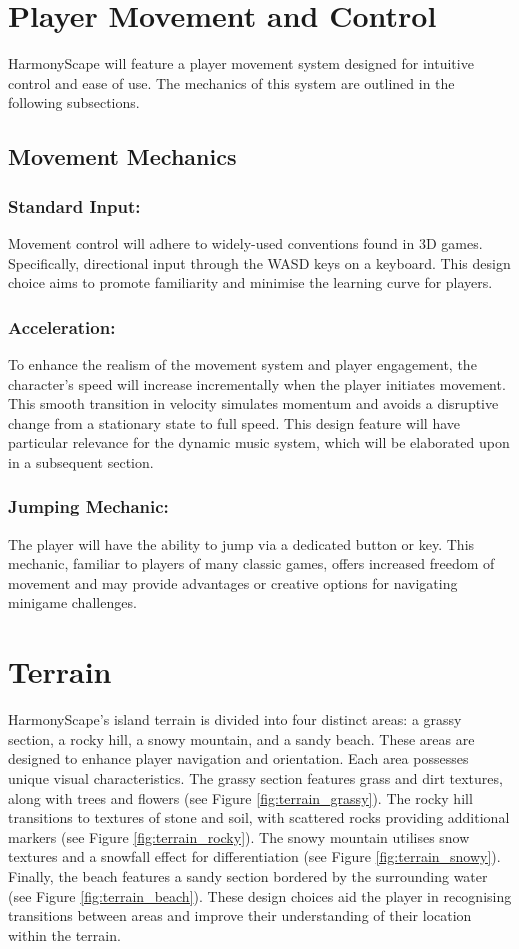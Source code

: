 \documentclass{l4proj}
\begin{document}
\section{Player Movement and Control}\label{sec:move_&_control}
HarmonyScape will feature a player movement system designed for intuitive control and ease of use. The mechanics of this system are outlined in the following subsections.

\subsection{Movement Mechanics}

\subsubsection{Standard Input:} Movement control will adhere to widely-used conventions found in 3D games. Specifically, directional input through the WASD keys on a keyboard. This design choice aims to promote familiarity and minimise the learning curve for players.

\subsubsection{Acceleration:} To enhance the realism of the movement system and player engagement, the character's speed will increase incrementally when the player initiates movement. This smooth transition in velocity simulates momentum and avoids a disruptive change from a stationary state to full speed. This design feature will have particular relevance for the dynamic music system, which will be elaborated upon in a subsequent section.

\subsubsection{Jumping Mechanic:} The player will have the ability to jump via a dedicated button or key. This mechanic, familiar to players of many classic games, offers increased freedom of movement and may provide advantages or creative options for navigating minigame challenges.

\section{Terrain}
HarmonyScape's island terrain is divided into four distinct areas: a grassy section, a rocky hill, a snowy mountain, and a sandy beach. These areas are designed to enhance player navigation and orientation. Each area possesses unique visual characteristics. The grassy section features grass and dirt textures, along with trees and flowers (see Figure \ref{fig:terrain_grassy}). The rocky hill transitions to textures of stone and soil, with scattered rocks providing additional markers (see Figure \ref{fig:terrain_rocky}). The snowy mountain utilises snow textures and a snowfall effect for differentiation (see Figure \ref{fig:terrain_snowy}). Finally, the beach features a sandy section bordered by the surrounding water (see Figure \ref{fig:terrain_beach}). These design choices aid the player in recognising transitions between areas and improve their understanding of their location within the terrain.
\end{document}
